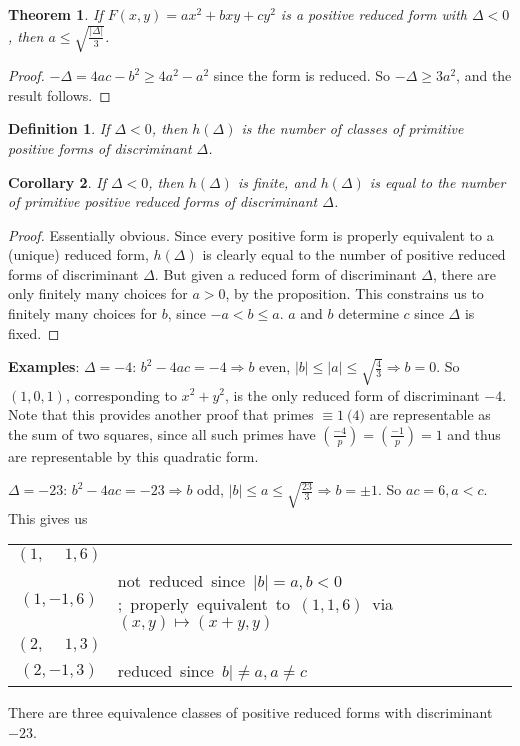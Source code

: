 \documentclass[12pt]{article}
\newcommand{\Leg}[2]{\left(\frac{#1}{#2}\right)}
\newtheorem{thm}{Theorem}
\newtheorem{cor}[thm]{Corollary}
\newtheorem{defn}{Definition}
\begin{document}
\begin{thm} If $F(x,y)=ax^2+bxy+cy^2$ is a positive reduced form with $\Delta<0$, then $a\leq \sqrt{\frac{|\Delta|}{3}}$.
\end{thm}

\begin{proof}
$-\Delta = 4ac - b^2 \geq 4a^2-a^2$ since the form is reduced. So $-\Delta \geq 3a^2$, and the result follows.
\end{proof}

\begin{defn} If $\Delta<0$, then \emph{$h(\Delta)$} is the number of classes of primitive positive forms of discriminant $\Delta$.
\end{defn}

\begin{cor} If $\Delta<0$, then $h(\Delta)$ is finite, and $h(\Delta)$ is equal to the number of primitive positive reduced forms of discriminant $\Delta$.\label{cor:finite}
\end{cor}

\begin{proof}
Essentially obvious. Since every positive form is properly equivalent to a (unique) reduced form, $h(\Delta)$ is clearly equal to the number of positive reduced forms of discriminant $\Delta$. But given a reduced form of discriminant $\Delta$, there are only finitely many choices for $a>0$, by the proposition. This constrains us to finitely many choices for $b$, since $-a<b\leq a$. $a$ and $b$ determine $c$ since $\Delta$ is fixed.
\end{proof}

\textbf{Examples}:
$\Delta=-4$: $b^2-4ac=-4 \Rightarrow b$ even, $|b|\leq |a|\leq \sqrt{\frac{4}{3}} \Rightarrow b=0$. So $(1,0,1)$, corresponding to $x^2+y^2$, is the only reduced form of discriminant $-4$. Note that this provides another proof that primes $\equiv 1\pod 4$ are representable as the sum of two squares, since all such primes have $\Leg{-4}{p}=\Leg{-1}{p}=1$ and thus are representable by this quadratic form.

$\Delta=-23$: $b^2-4ac=-23 \Rightarrow b$ odd, $|b|\leq a \leq \sqrt{\frac{23}{3}} \Rightarrow b=\pm 1$. So $ac=6, a<c$. This gives us
\begin{center}
\begin{tabular}{c l}
$(1,\phantom{-}1,6)$&\\
$(1,-1,6)$&\mbox{\small not reduced since $|b|=a,b<0$; properly equivalent to $(1,1,6)$ via $(x,y)\mapsto (x+y,y)$}\\
$(2,\phantom{-}1,3)$&\\
$(2,-1,3)$&\mbox{\small reduced since $b|\neq a, a\neq c$}
\end{tabular}
\end{center}
There are three equivalence classes of positive reduced forms with discriminant $-23$.
\end{document}
